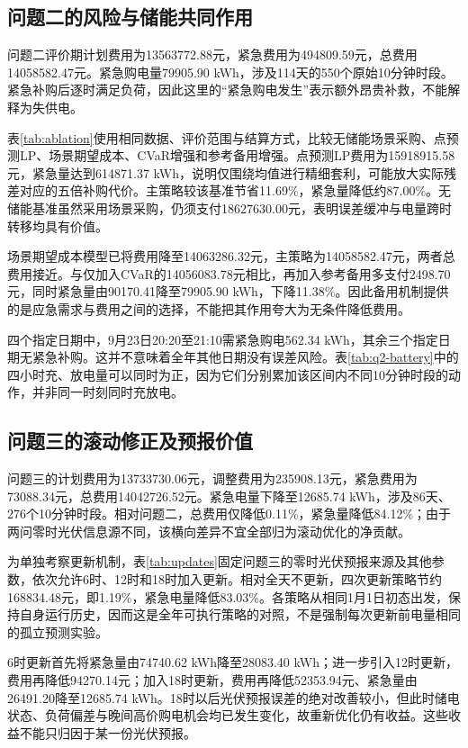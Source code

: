 \subsection{问题二的风险与储能共同作用}

问题二评价期计划费用为13563772.88元，紧急费用为494809.59元，总费用14058582.47元。紧急购电量79905.90 kWh，涉及114天的550个原始10分钟时段。紧急补购后逐时满足负荷，因此这里的“紧急购电发生”表示额外昂贵补救，不能解释为失供电。

表\ref{tab:ablation}使用相同数据、评价范围与结算方式，比较无储能场景采购、点预测LP、场景期望成本、CVaR增强和参考备用增强。点预测LP费用为15918915.58元，紧急量达到614871.37 kWh，说明仅围绕均值进行精细套利，可能放大实际残差对应的五倍补购代价。主策略较该基准节省11.69\%，紧急量降低约87.00\%。无储能基准虽然采用场景采购，仍须支付18627630.00元，表明误差缓冲与电量跨时转移均具有价值。

场景期望成本模型已将费用降至14063286.32元，主策略为14058582.47元，两者总费用接近。与仅加入CVaR的14056083.78元相比，再加入参考备用多支付2498.70元，同时紧急量由90170.41降至79905.90 kWh，下降11.38\%。因此备用机制提供的是应急需求与费用之间的选择，不能把其作用夸大为无条件降低费用。




四个指定日期中，9月23日20:20至21:10需紧急购电562.34 kWh，其余三个指定日期无紧急补购。这并不意味着全年其他日期没有误差风险。表\ref{tab:q2-battery}中的四小时充、放电量可以同时为正，因为它们分别累加该区间内不同10分钟时段的动作，并非同一时刻同时充放电。
\FloatBarrier

\subsection{问题三的滚动修正及预报价值}

问题三的计划费用为13733730.06元，调整费用为235908.13元，紧急费用为73088.34元，总费用14042726.52元。紧急电量下降至12685.74 kWh，涉及86天、276个10分钟时段。相对问题二，总费用仅降低0.11\%，紧急量降低84.12\%；由于两问零时光伏信息源不同，该横向差异不宜全部归为滚动优化的净贡献。

为单独考察更新机制，表\ref{tab:updates}固定问题三的零时光伏预报来源及其他参数，依次允许6时、12时和18时加入更新。相对全天不更新，四次更新策略节约168834.48元，即1.19\%，紧急电量降低83.03\%。各策略从相同1月1日初态出发，保持自身运行历史，因而这是全年可执行策略的对照，不是强制每次更新前电量相同的孤立预测实验。

6时更新首先将紧急量由74740.62 kWh降至28083.40 kWh；进一步引入12时更新，费用再降低94270.14元；加入18时更新，费用再降低52353.94元、紧急量由26491.20降至12685.74 kWh。18时以后光伏预报误差的绝对改善较小，但此时储电状态、负荷偏差与晚间高价购电机会均已发生变化，故重新优化仍有收益。这些收益不能只归因于某一份光伏预报。

